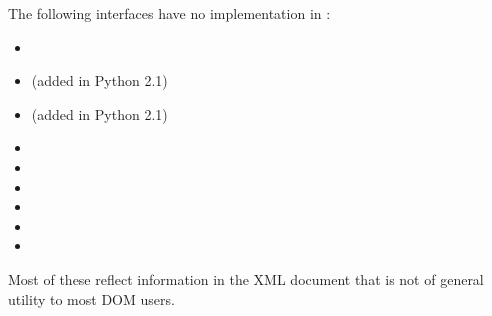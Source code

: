 The following interfaces have no implementation in
:

\begin{itemize}
\item {}

\item {} (added in Python 2.1)

\item {} (added in Python 2.1)

\item {}

\item {}

\item {}

\item {}

\item {}

\item {}
\end{itemize}

Most of these reflect information in the XML document that is not of
general utility to most DOM users.
